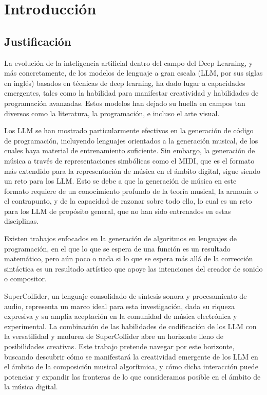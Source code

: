 \chapter{Introducción}

\section{Justificación}

La evolución de la inteligencia artificial dentro del campo del Deep Learning, y más concretamente, de los modelos de lenguaje a gran escala (LLM, por sus siglas en inglés) basados en técnicas de deep learning, ha dado lugar a capacidades emergentes, tales como la habilidad para manifestar creatividad y habilidades de programación avanzadas. Estos modelos han dejado su huella en campos tan diversos como la literatura, la programación, e incluso el arte visual.

Los LLM se han mostrado particularmente efectivos en la generación de código de programación, incluyendo lenguajes orientados a la generación musical, de los cuales haya material de entrenamiento suficiente. Sin embargo, la generación de música a través de representaciones simbólicas como el MIDI, que es el formato más extendido para la representación de música en el ámbito digital, sigue siendo un reto para los LLM. Esto se debe a que la generación de música en este formato requiere de un conocimiento profundo de la teoría musical, la armonía o el contrapunto, y de la capacidad de razonar sobre todo ello, lo cual es un reto para los LLM de propósito general, que no han sido entrenados en estas disciplinas.

Existen trabajos enfocados en la generación de algoritmos en lenguajes de programación, en el que lo que se espera de una función es un resultado matemático, pero aún poco o nada si lo que se espera más allá de la corrección sintáctica es un resultado artístico que apoye las intenciones del creador de sonido o compositor.

SuperCollider, un lenguaje consolidado de síntesis sonora y procesamiento de audio, representa un marco ideal para esta investigación, dada su riqueza expresiva y su amplia aceptación en la comunidad de música electrónica y experimental. La combinación de las habilidades de codificación de los LLM con la versatilidad y madurez de SuperCollider abre un horizonte lleno de posibilidades creativas. Este trabajo pretende navegar por este horizonte, buscando descubrir cómo se manifestará la creatividad emergente de los LLM en el ámbito de la composición musical algorítmica, y cómo dicha interacción puede potenciar y expandir las fronteras de lo que consideramos posible en el ámbito de la música digital.

